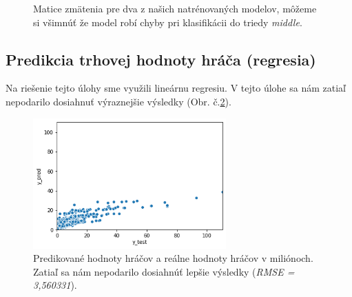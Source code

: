 \documentclass[runningheads]{llncs}
\begin{document}
\begin{figure}%
    \centering
    \qquad
    \caption{Matice zmätenia pre dva z našich natrénovaných modelov, môžeme si všimnúť že model robí chyby pri klasifikácii do triedy \textit{middle}.}%
    \label{fig:confusion_matrix_position_4}%
\end{figure}

\subsection{\label{regression} Predikcia trhovej hodnoty hráča (regresia)}

Na riešenie tejto úlohy sme využili lineárnu regresiu. V tejto úlohe sa nám zatiaľ nepodarilo dosiahnuť výraznejšie výsledky (Obr. č.\ref{fig:value_pred_true_scatterplot}).

\begin{figure}[htp]
    \centering
    \includegraphics[height=5cm]{images/value_pred_true_scatterplot}
    \caption{Predikované hodnoty hráčov a reálne hodnoty hráčov v miliónoch. Zatiaľ sa nám nepodarilo dosiahnúť lepšie výsledky (\textit{RMSE = 3,560331}).}
    \label{fig:value_pred_true_scatterplot}
\end{figure}
\end{document}
